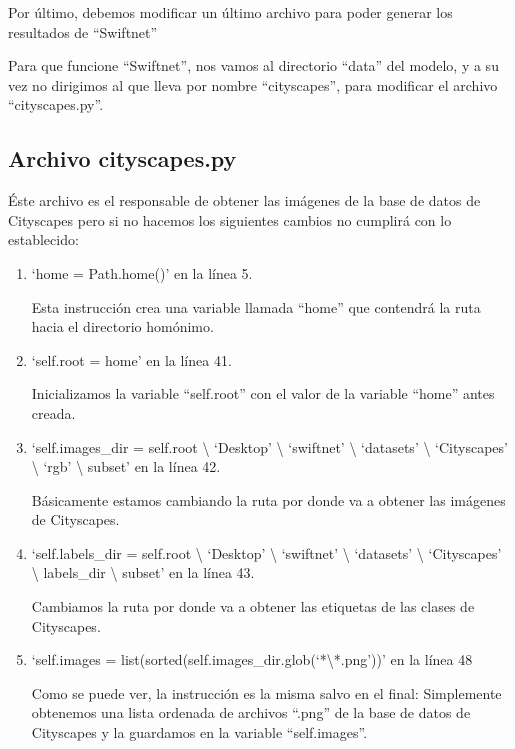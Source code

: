 Por último, debemos modificar un último archivo para poder generar los resultados de ``Swiftnet''

Para que funcione ``Swiftnet'', nos vamos al directorio ``data'' del modelo, y a su vez no dirigimos al que lleva por nombre ``cityscapes'', para modificar el archivo ``cityscapes.py''.

\subsection{Archivo cityscapes.py}

Éste archivo es el responsable de obtener las imágenes de la base de datos de Cityscapes pero si no hacemos los siguientes cambios no cumplirá con lo establecido:

\begin{enumerate}
\item `home = Path.home()' en la línea 5.

Esta instrucción crea una variable llamada ``home'' que contendrá la ruta hacia el directorio homónimo.

\item `self.root = home' en la línea 41.

Inicializamos la variable ``self.root'' con el valor de la variable ``home'' antes creada.

\item `self.images\_dir = self.root \textbackslash{} `Desktop' \textbackslash{} `swiftnet' \textbackslash{} `datasets' \textbackslash{} `Cityscapes' \textbackslash{} `rgb' \textbackslash{} subset' en la línea 42.

Básicamente estamos cambiando la ruta por donde va a obtener las imágenes de Cityscapes.

\item `self.labels\_dir = self.root \textbackslash{} `Desktop' \textbackslash{} `swiftnet' \textbackslash{} `datasets' \textbackslash{} `Cityscapes' \textbackslash{} labels\_dir \textbackslash{} subset' en la línea 43.

Cambiamos la ruta por donde va a obtener las etiquetas de las clases de Cityscapes.

\item `self.images = list(sorted(self.images\_dir.glob(`*\textbackslash{*.png}'))' en la línea 48

Como se puede ver, la instrucción es la misma salvo en el final: Simplemente obtenemos una lista ordenada de archivos ``.png'' de la base de datos de Cityscapes y la guardamos en la variable ``self.images''.
\end{enumerate}

